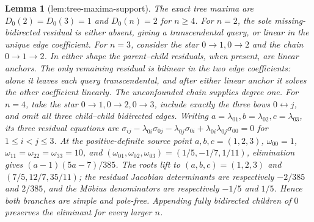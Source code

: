 \documentclass{article}
\newtheorem{lemma}{Lemma}
\begin{document}
\begin{lemma}[lem:tree-maxima-support]\label{lem:tree-maxima-support}
The exact tree maxima are \(D_0(2)=D_0(3)=1\) and \(D_0(n)=2\) for \(n\ge4\). For \(n=2\), the sole missing-bidirected residual is either absent, giving a transcendental query, or linear in the unique edge coefficient. For \(n=3\), consider the star \(0\to1,0\to2\) and the chain \(0\to1\to2\). In either shape the parent--child residuals, when present, are linear anchors. The only remaining residual is bilinear in the two edge coefficients: alone it leaves each query transcendental, and after either linear anchor it solves the other coefficient linearly. The unconfounded chain supplies degree one. For \(n=4\), take the star \(0\to1,0\to2,0\to3\), include exactly the three bows \(0\leftrightarrow j\), and omit all three child--child bidirected edges. Writing \(a=\lambda_{01},b=\lambda_{02},c=\lambda_{03}\), its three residual equations are \(\sigma_{ij}-\lambda_{0i}\sigma_{0j}-\lambda_{0j}\sigma_{0i}+\lambda_{0i}\lambda_{0j}\sigma_{00}=0\) for \(1\le i<j\le3\). At the positive-definite source point \(a,b,c=(1,2,3)\), \(\omega_{00}=1\), \(\omega_{11}=\omega_{22}=\omega_{33}=10\), and \((\omega_{01},\omega_{02},\omega_{03})=(1/5,-1/7,1/11)\), elimination gives \((a-1)(5a-7)/385\). The roots lift to \((a,b,c)=(1,2,3)\) and \((7/5,12/7,35/11)\); the residual Jacobian determinants are respectively \(-2/385\) and \(2/385\), and the Möbius denominators are respectively \(-1/5\) and \(1/5\). Hence both branches are simple and pole-free. Appending fully bidirected children of \(0\) preserves the eliminant for every larger \(n\).
\end{lemma}
\end{document}
